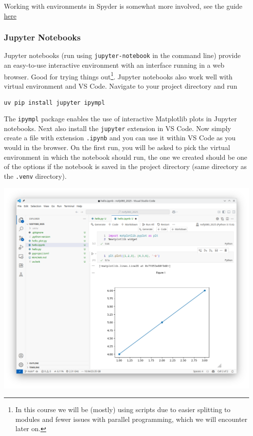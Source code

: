 Working with environments in Spyder is somewhat more involved, see the guide \href{https://github.com/spyder-ide/spyder/wiki/Working-with-packages-and-environments-in-Spyder#working-with-other-environments-and-python-installations}{here}

\subsubsection{Jupyter Notebooks}
Jupyter notebooks (run using \verb|jupyter-notebook| in the command line) provide an easy-to-use interactive environment with an interface running in a web browser. Good for trying things out\footnote{In this course we will be (mostly) using scripts due to easier splitting to modules and fewer issues with parallel programming, which we will encounter later on.}. Jupyter notebooks also work well with virtual environment and VS Code. Navigate to your project directory and run
\begin{lstlisting}
uv pip install jupyter ipympl
\end{lstlisting}
The \verb|ipympl| package enables the use of interactive Matplotlib plots in Jupyter notebooks. Next also install the \verb|jupyter| extension in VS Code. Now simply create a file with extension \verb|.ipynb| and you can use it within VS Code as you would in the browser. On the first run, you will be asked to pick the virtual environment in which the notebook should run, the one we created should be one of the options if the notebook is saved in the project directory (same directory as the \verb|.venv| directory).

\begin{center}
    \includegraphics[width=0.9\linewidth]{vscode_jupyter.png}
\end{center}